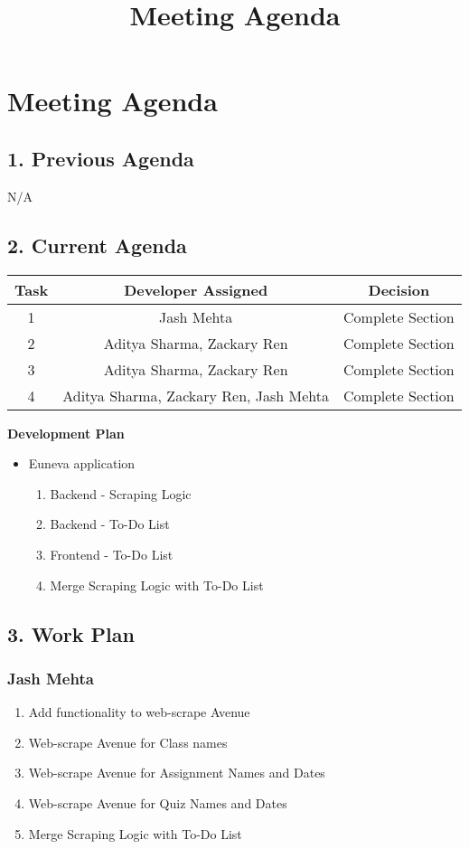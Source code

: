 \documentclass[11pt, oneside]{article}   	%
\title{Meeting Agenda}
\author{}
\begin{document}
\setlength{\headsep}{50pt}
\section*{Meeting Agenda}

\subsection*{1. Previous Agenda}
N/A
\newpage{}

\setlength{\headsep}{25pt}
\subsection*{2. Current Agenda}

\begin{center}
\begin{tabular}{ | c | c | c | }
\hline
Task & Developer Assigned & Decision \\
\hline
1 & Jash Mehta & Complete Section\\
\hline 
2 & Aditya Sharma, Zackary Ren & Complete Section \\
\hline
3 & Aditya Sharma, Zackary Ren & Complete Section \\
\hline
4 & Aditya Sharma, Zackary Ren, Jash Mehta & Complete Section \\
\hline 
\end{tabular}
\end{center}


\textbf{Development Plan}
\begin{itemize}
\item Euneva application
\begin{enumerate}
\item Backend - Scraping Logic
\item Backend - To-Do List
\item Frontend - To-Do List
\item Merge Scraping Logic with To-Do List
\end{enumerate}
\end{itemize}
\newpage{}

\setlength{\headsep}{25pt}
\subsection*{3. Work Plan}
\subsubsection*{Jash Mehta}
\begin{enumerate}
\item Add functionality to web-scrape Avenue
\item Web-scrape Avenue for Class names
\item Web-scrape Avenue for Assignment Names and Dates
\item Web-scrape Avenue for Quiz Names and Dates
\item Merge Scraping Logic with To-Do List
\end{enumerate}
\end{document}
